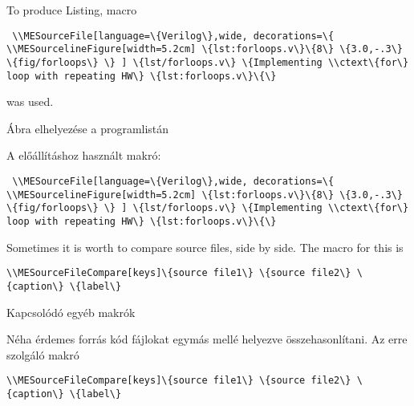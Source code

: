 {
To produce Listing\ao{ \ref{lst:forloops.v}},
 macro
\par\noindent\lstinline|
\\MESourceFile[language=\{Verilog\},wide,
decorations=\{
\\MESourcelineFigure[width=5.2cm] \{lst:forloops.v\}\{8\} \{3.0,-.3\} \{fig/forloops\}
\}
] \{lst/forloops.v\} \{Implementing \\ctext\{for\} loop with repeating HW\} \{lst:forloops.v\}\{\}|
\par\noindent was used.

}
{Ábra elhelyezése a programlistán}
{
A \ao{\ref{lst:forloops.v}} előállításhoz használt makró:
\par\noindent\lstinline|
\\MESourceFile[language=\{Verilog\},wide,
decorations=\{
\\MESourcelineFigure[width=5.2cm] \{lst:forloops.v\}\{8\} \{3.0,-.3\} \{fig/forloops\}
\}
] \{lst/forloops.v\} \{Implementing \\ctext\{for\} loop with repeating HW\} \{lst:forloops.v\}\{\}|

}





{
Sometimes it is worth to compare source files, side by side.
The macro for this is
\par\noindent\lstinline|\\MESourceFileCompare[keys]\{source file1\} \{source file2\} \{caption\} \{label\}|
}
{Kapcsolódó egyéb makrók}
{
Néha érdemes forrás kód fájlokat egymás mellé helyezve összehasonlítani.
Az erre szolgáló makró
\par\noindent\lstinline|\\MESourceFileCompare[keys]\{source file1\} \{source file2\} \{caption\} \{label\}|
}

